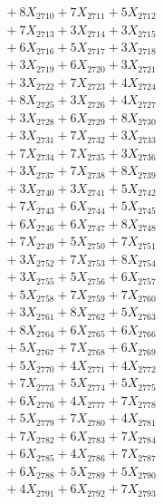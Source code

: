 \documentclass[a4paper,10pt]{article}
\begin{document}
{\begin{align}
&\;  + 8 X_{2710} + 7 X_{2711} + 5 X_{2712} \\[0.3ex]
&\;  + 7 X_{2713} + 3 X_{2714} + 3 X_{2715} \\[0.3ex]
&\;  + 6 X_{2716} + 5 X_{2717} + 3 X_{2718} \\[0.3ex]
&\;  + 3 X_{2719} + 6 X_{2720} + 3 X_{2721} \\[0.3ex]
&\;  + 3 X_{2722} + 7 X_{2723} + 4 X_{2724} \\[0.3ex]
&\;  + 8 X_{2725} + 3 X_{2726} + 4 X_{2727} \\[0.3ex]
&\;  + 3 X_{2728} + 6 X_{2729} + 8 X_{2730} \\[0.3ex]
&\;  + 3 X_{2731} + 7 X_{2732} + 3 X_{2733} \\[0.3ex]
&\;  + 7 X_{2734} + 7 X_{2735} + 3 X_{2736} \\[0.3ex]
&\;  + 3 X_{2737} + 7 X_{2738} + 8 X_{2739} \\[0.5ex]\allowbreak
&\;  + 3 X_{2740} + 3 X_{2741} + 5 X_{2742} \\[0.3ex]
&\;  + 7 X_{2743} + 6 X_{2744} + 5 X_{2745} \\[0.3ex]
&\;  + 6 X_{2746} + 6 X_{2747} + 8 X_{2748} \\[0.3ex]
&\;  + 7 X_{2749} + 5 X_{2750} + 7 X_{2751} \\[0.3ex]
&\;  + 3 X_{2752} + 7 X_{2753} + 8 X_{2754} \\[0.3ex]
&\;  + 3 X_{2755} + 5 X_{2756} + 6 X_{2757} \\[0.3ex]
&\;  + 5 X_{2758} + 7 X_{2759} + 7 X_{2760} \\[0.3ex]
&\;  + 3 X_{2761} + 8 X_{2762} + 5 X_{2763} \\[0.3ex]
&\;  + 8 X_{2764} + 6 X_{2765} + 6 X_{2766} \\[0.3ex]
&\;  + 5 X_{2767} + 7 X_{2768} + 6 X_{2769} \\[0.5ex]\allowbreak
&\;  + 5 X_{2770} + 4 X_{2771} + 4 X_{2772} \\[0.3ex]
&\;  + 7 X_{2773} + 5 X_{2774} + 5 X_{2775} \\[0.3ex]
&\;  + 6 X_{2776} + 4 X_{2777} + 7 X_{2778} \\[0.3ex]
&\;  + 5 X_{2779} + 7 X_{2780} + 4 X_{2781} \\[0.3ex]
&\;  + 7 X_{2782} + 6 X_{2783} + 7 X_{2784} \\[0.3ex]
&\;  + 6 X_{2785} + 4 X_{2786} + 7 X_{2787} \\[0.3ex]
&\;  + 6 X_{2788} + 5 X_{2789} + 5 X_{2790} \\[0.3ex]
&\;  + 4 X_{2791} + 6 X_{2792} + 7 X_{2793} \\[0.3ex]

\end{align}}
\end{document}
